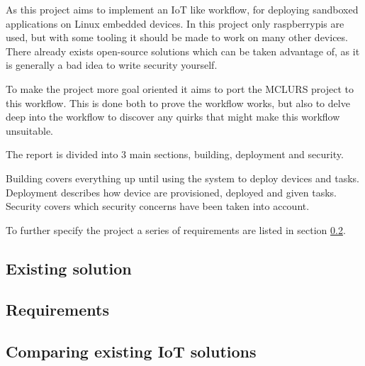 \documentclass[../../main.tex]{subfiles}
\begin{document}
As this project aims to implement an IoT like workflow, for deploying sandboxed applications
on Linux embedded devices. In this project only raspberrypis are used, but with some
tooling it should be made to work on many other devices.\\

There already exists open-source solutions which can be taken advantage of, as it is generally a bad
idea to write security yourself.

To make the project more goal oriented it aims to port the MCLURS project to this workflow.
This is done both to prove the workflow works, but also to delve deep into the workflow
to discover any quirks that might make this workflow unsuitable.

The report is divided into 3 main sections, building, deployment and security.

Building covers everything up until using the system to deploy devices and tasks.
Deployment describes how device are provisioned, deployed and given tasks.
Security covers which security concerns have been taken into account.

To further specify the project a series of requirements are listed in section \ref{sub:requirements}.


\subsection{Existing solution}%
\label{sub:existing_solution}


\subsection{Requirements}%
\label{sub:requirements}


\subsection{Comparing existing IoT solutions}%
\label{sub:comparing_existing_iot_solutions}

	
\end{document}
